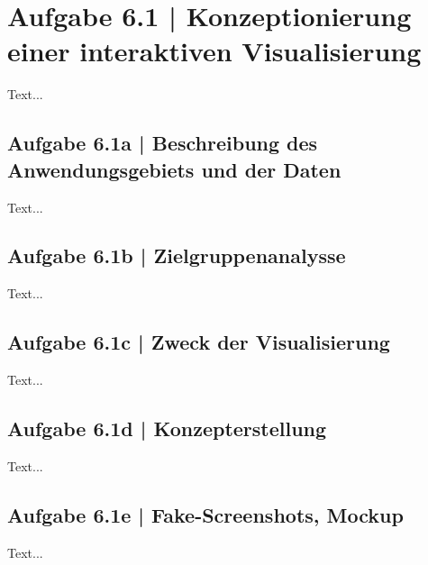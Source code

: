 \documentclass[a4paper,12pt,ngerman]{scrartcl}
\begin{document}
\pagestyle{fancy} %

\section{Aufgabe 6.1 | Konzeptionierung einer interaktiven Visualisierung}
Text...

\subsection{Aufgabe 6.1a | Beschreibung des Anwendungsgebiets und der Daten}
Text...

\subsection{Aufgabe 6.1b | Zielgruppenanalysse}
Text...

\subsection{Aufgabe 6.1c | Zweck der Visualisierung}
Text...

\subsection{Aufgabe 6.1d | Konzepterstellung}
Text...

\subsection{Aufgabe 6.1e | Fake-Screenshots, Mockup}
Text...
\end{document}
